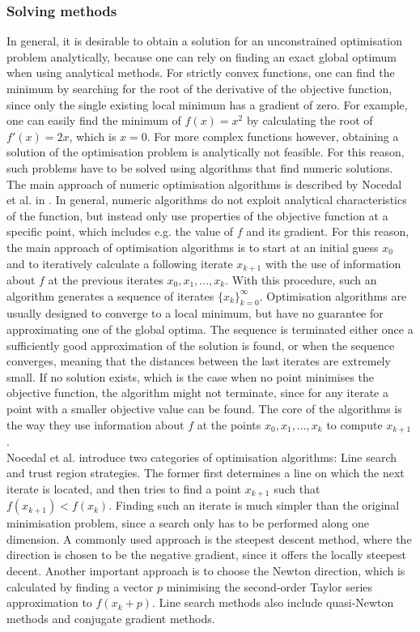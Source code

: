 \subsubsection{Solving methods}
In general, it is desirable to obtain a solution for an unconstrained optimisation problem analytically, because one can rely on finding an exact global optimum when using analytical methods. For strictly convex functions, one can find the minimum by searching for the root of the derivative of the objective function, since only the single existing local minimum has a gradient of zero. For example, one can easily find the minimum of $f(x) = x^2$ by calculating the root of $f'(x) = 2x$, which is $x = 0$. For more complex functions however, obtaining a solution of the optimisation problem is analytically not feasible. For this reason, such problems have to be solved using algorithms that find numeric solutions. The main approach of numeric optimisation algorithms is described by Nocedal et al. in \cite{NoceWrig06}. In general, numeric algorithms do not exploit analytical characteristics of the function, but instead only use properties of the objective function at a specific point, which includes e.g. the value of $f$ and its gradient. For this reason, the main approach of optimisation algorithms is to start at an initial guess $x_0$ and to iteratively calculate a following iterate $x_{k+1}$ with the use of information about $f$ at the previous iterates $x_0, x_1, ..., x_k$. With this procedure, such an algorithm generates a sequence of iterates $\{x_k\}_{k=0}^\infty$. Optimisation algorithms are usually designed to converge to a local minimum, but have no guarantee for approximating one of the global optima. The sequence is terminated either once a sufficiently good approximation of the solution is found, or when the sequence converges, meaning that the distances between the last iterates are extremely small. If no solution exists, which is the case when no point minimises the objective function, the algorithm might not terminate, since for any iterate a point with a smaller objective value can be found. The core of the algorithms is the way they use information about $f$ at the points $x_0, x_1, ..., x_k$ to compute $x_{k+1}$. \\
\indent Nocedal et al. introduce two categories of optimisation algorithms: Line search and trust region strategies. The former first determines a line on which the next iterate is located, and then tries to find a point $x_{k+1}$ such that $f(x_{k+1}) < f(x_k)$. Finding such an iterate is much simpler than the original minimisation problem, since a search only has to be performed along one dimension. A commonly used approach is the steepest descent method, where the direction is chosen to be the negative gradient, since it offers the locally steepest decent. Another important approach is to choose the Newton direction, which is calculated by finding a vector $p$ minimising the second-order Taylor series approximation to $f(x_k + p)$. Line search methods also include quasi-Newton methods and conjugate gradient methods.\\ 
